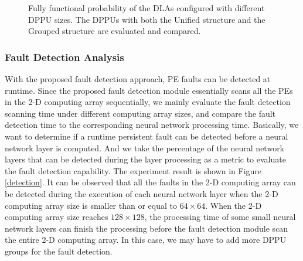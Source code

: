 \begin{figure}
\setlength{\abovecaptionskip}{-10pt}
\setlength{\belowcaptionskip}{0pt}
    \caption{Fully functional probability of the DLAs configured with different DPPU sizes. The DPPUs with both the Unified structure and the Grouped structure are evaluated and compared.}
\label{fig:DPPU}
\vspace{-1.5em}
\end{figure}

\subsubsection{Fault Detection Analysis}
With the proposed fault detection approach, PE faults can be detected at runtime. Since the proposed fault detection module essentially scans all the PEs in the 2-D computing array sequentially, we mainly evaluate the fault detection scanning time under different computing array sizes, and compare the fault detection time to the corresponding neural network processing time. Basically, we want to determine if a runtime persistent fault can be detected before a neural network layer is computed. And we take the percentage of the neural network layers that can be detected during the layer processing as a metric to evaluate the fault detection capability. The experiment result is shown in Figure \ref{detection}. It can be observed that all the faults in the 2-D computing array can be detected during the execution of each neural network layer when the 2-D computing array size is smaller than or equal to $64 \times 64$. When the 2-D computing array size reaches $128 \times 128$, the processing time of some small neural network layers can finish the processing before the fault detection module scan the entire 2-D computing array. In this case, we may have to add more DPPU groups for the fault detection. 

